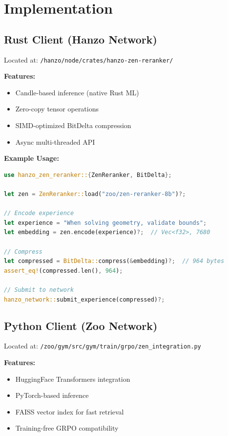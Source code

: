 \section{Implementation}


\subsection{Rust Client (Hanzo Network)}

Located at: \texttt{/hanzo/node/crates/hanzo-zen-reranker/}

\textbf{Features:}
\begin{itemize}
\item Candle-based inference (native Rust ML)
\item Zero-copy tensor operations
\item SIMD-optimized BitDelta compression
\item Async multi-threaded API
\end{itemize}

\textbf{Example Usage:}
\begin{lstlisting}[language=Rust, basicstyle=\small\ttfamily]
use hanzo_zen_reranker::{ZenReranker, BitDelta};

let zen = ZenReranker::load("zoo/zen-reranker-8b")?;

// Encode experience
let experience = "When solving geometry, validate bounds";
let embedding = zen.encode(experience)?;  // Vec<f32>, 7680

// Compress
let compressed = BitDelta::compress(&embedding)?;  // 964 bytes
assert_eq!(compressed.len(), 964);

// Submit to network
hanzo_network::submit_experience(compressed)?;
\end{lstlisting}

\subsection{Python Client (Zoo Network)}

Located at: \texttt{/zoo/gym/src/gym/train/grpo/zen\_integration.py}

\textbf{Features:}
\begin{itemize}
\item HuggingFace Transformers integration
\item PyTorch-based inference
\item FAISS vector index for fast retrieval
\item Training-free GRPO compatibility
\end{itemize}

